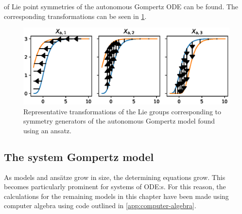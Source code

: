 of Lie point symmetries of the autonomous Gompertz ODE  can be found.
The corresponding transformations can be seen in \cref{fig:gompertz-autonomous-ansatz}.
\begin{figure}
  \centering
  \includegraphics[width=.96\textwidth]{images/gompertz-autonomous-ansatz}
  \caption{Representative transformations of the Lie groups corresponding to symmetry generators of the autonomous Gompertz model found using an ansatz.}
  \label{fig:gompertz-autonomous-ansatz}
\end{figure}

\subsection{The system Gompertz model}

As models and ansätze grow in size, the determining equations grow.
This becomes particularly prominent for systems of ODE:s.
For this reason, the calculations for the remaining models in this chapter have been made using computer algebra using code outlined in \cref{app:computer-algebra}.

